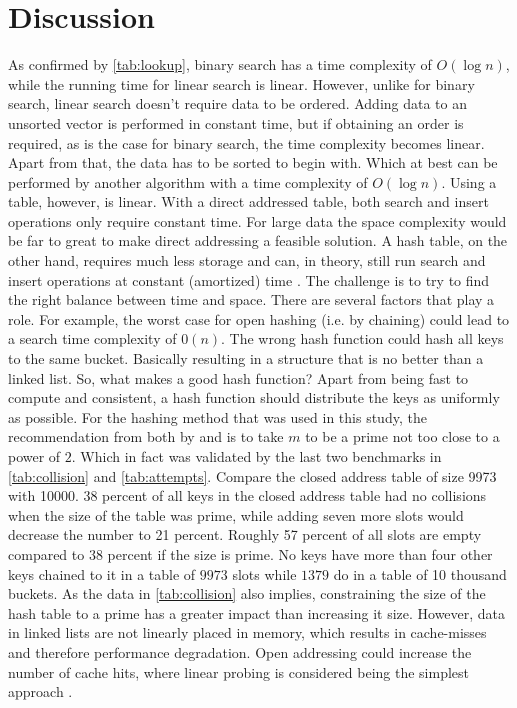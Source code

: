 \documentclass[a4paper, 11pt]{article}
\begin{document}
    \clearpage
    \section*{Discussion}
    \label{sec:discussion}
    As confirmed by \autoref{tab:lookup}, binary search has a time complexity of $O(\log n)$,
    while the running time for linear search is linear. However, unlike for binary search, 
    linear search doesn't require data to be ordered. 
    Adding data to an unsorted vector is performed in constant time, but if obtaining 
    an order is required, as is the case for binary search,  
    the time complexity becomes linear. Apart from that, the data has to be sorted
    to begin with. Which at best can be performed by another algorithm with a 
    time complexity of $O(\log n)$. Using a table, however, is linear. 
    With a direct addressed table, both search and insert operations only 
    require constant time. For large data the space complexity 
    would be far to great to make direct addressing a feasible solution.  
    A hash table, on the other hand, requires much less storage and can, in theory, still 
    run search and insert operations at constant (amortized) time \parencite{Segeqick2011Alg4th}.
    The challenge is to try to find the right balance between time and space.
    There are several factors that play a role. 
    For example, the worst case for open hashing (i.e. by chaining) could lead to a 
    search time complexity of $0(n)$. The wrong hash function could 
    hash all keys to the same bucket. Basically resulting in a structure that is no better 
    than a linked list. So, what makes a good hash function? Apart from being fast to compute 
    and consistent, a hash function should distribute the keys as uniformly as possible.  
    For the hashing method that was used in this study, 
    the recommendation from both 
    by \textcite{Segeqick2011Alg4th} and \textcite{CormenThomasH2022ItA}
    is to take $m$ to be a prime not too close to a power of $2$. Which in fact 
    was validated by the last two benchmarks in \autoref{tab:collision} and
    \autoref{tab:attempts}. 
    Compare the closed address table of size \num{9973} with \num{10000}.  
    38 percent of all keys in the closed address table 
    had no collisions when the size of the table was prime, while adding seven more slots would
    decrease the number to 21 percent. Roughly 57 percent of all slots are empty compared 
    to $38$ percent if the size is prime. No keys have more than four other keys chained to it 
    in a table of $9973$ slots while $1379$ do in a table of \num{10} thousand buckets. 
    As the data in \autoref{tab:collision} also implies, constraining the size of the hash table 
    to a prime has a greater impact than increasing it size.
    However, data in linked lists are not linearly placed in memory, which
    results in cache-misses and therefore performance degradation. 
    Open addressing could increase the number of cache hits, where linear probing 
    is considered being the simplest approach \parencite{CormenThomasH2022ItA}. 
       
\end{document}
